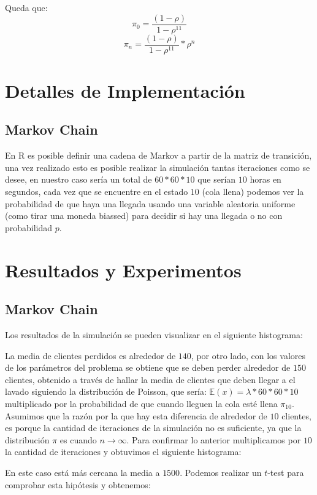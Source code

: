 \documentclass[14pt]{extarticle}
\begin{document}
Queda que: 
	$$\pi_0 = \frac{(1 - \rho)}{1 - \rho^{11}}$$
	$$\pi_n = \frac{(1 - \rho)} { 1 - \rho^{11}} * \rho^n$$

\section{Detalles de Implementación}

\subsection{Markov Chain}

En R es posible definir una cadena de Markov a partir de la matriz de transición, una vez realizado esto es posible realizar la simulación tantas iteraciones como se desee, en nuestro caso sería un total de $60 * 60 * 10$ que serían $10$ horas en segundos, cada vez que se encuentre en el estado $10$ (cola llena) podemos ver la probabilidad de que haya una llegada usando una variable aleatoria uniforme (como tirar una moneda biassed) para decidir si hay una llegada o no con probabilidad $p$.

\section{Resultados y Experimentos}

\subsection{Markov Chain}
    Los resultados de la simulación se pueden visualizar en el siguiente histograma:

    La media de clientes perdidos es alrededor de $140$, por otro lado, con los valores de los parámetros del problema se obtiene que se deben perder alrededor de $150$ clientes, obtenido a través de hallar la media de clientes que deben llegar a el lavado siguiendo la distribución de Poisson, que sería: $\mathbb{E}(x) = \lambda * 60 * 60 * 10$ multiplicado por la probabilidad de que cuando lleguen la cola esté llena $\pi_{10}$. Asumimos que la razón por la que hay esta diferencia de alrededor de $10$ clientes, es porque la cantidad de iteraciones de la simulación no es suficiente, ya que la distribución $\pi$ es cuando $n \to \infty$. Para confirmar lo anterior multiplicamos por $10$ la cantidad de iteraciones y obtuvimos el siguiente histograma:

    En este caso está más cercana la media a $1500$. Podemos realizar un $t$-test para comprobar esta hipótesis y obtenemos:
\end{document}
